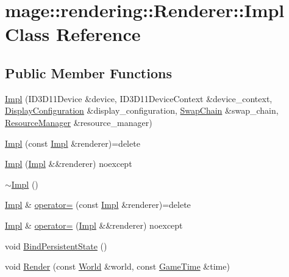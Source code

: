 \hypertarget{classmage_1_1rendering_1_1_renderer_1_1_impl}{}\section{mage\+:\+:rendering\+:\+:Renderer\+:\+:Impl Class Reference}
\label{classmage_1_1rendering_1_1_renderer_1_1_impl}
\subsection*{Public Member Functions}
\begin{DoxyCompactItemize}
\item 
\hyperlink{classmage_1_1rendering_1_1_renderer_1_1_impl_a51ee7e924709bda3d53e73e21352849c}{Impl} (I\+D3\+D11\+Device \&device, I\+D3\+D11\+Device\+Context \&device\+\_\+context, \hyperlink{classmage_1_1rendering_1_1_display_configuration}{Display\+Configuration} \&display\+\_\+configuration, \hyperlink{classmage_1_1rendering_1_1_swap_chain}{Swap\+Chain} \&swap\+\_\+chain, \hyperlink{classmage_1_1rendering_1_1_resource_manager}{Resource\+Manager} \&resource\+\_\+manager)
\item 
\hyperlink{classmage_1_1rendering_1_1_renderer_1_1_impl_a533defdba4bd48054c166ecbb46178f5}{Impl} (const \hyperlink{classmage_1_1rendering_1_1_renderer_1_1_impl}{Impl} \&renderer)=delete
\item 
\hyperlink{classmage_1_1rendering_1_1_renderer_1_1_impl_abc02d1958ce940e8b13d4fe3de3fd05f}{Impl} (\hyperlink{classmage_1_1rendering_1_1_renderer_1_1_impl}{Impl} \&\&renderer) noexcept
\item 
\hyperlink{classmage_1_1rendering_1_1_renderer_1_1_impl_a80064673490a87b9f3cd567e56d3de8f}{$\sim$\+Impl} ()
\item 
\hyperlink{classmage_1_1rendering_1_1_renderer_1_1_impl}{Impl} \& \hyperlink{classmage_1_1rendering_1_1_renderer_1_1_impl_a8eef87ba80c22cba7a2d83db9a740188}{operator=} (const \hyperlink{classmage_1_1rendering_1_1_renderer_1_1_impl}{Impl} \&renderer)=delete
\item 
\hyperlink{classmage_1_1rendering_1_1_renderer_1_1_impl}{Impl} \& \hyperlink{classmage_1_1rendering_1_1_renderer_1_1_impl_a1c40e03347062b200b3e1b214ea7b3ff}{operator=} (\hyperlink{classmage_1_1rendering_1_1_renderer_1_1_impl}{Impl} \&\&renderer) noexcept
\item 
void \hyperlink{classmage_1_1rendering_1_1_renderer_1_1_impl_a86f42e039c290e75378040805533bd41}{Bind\+Persistent\+State} ()
\item 
void \hyperlink{classmage_1_1rendering_1_1_renderer_1_1_impl_a88a8601b5fe72883788a87ba6c38b3aa}{Render} (const \hyperlink{classmage_1_1rendering_1_1_world}{World} \&world, const \hyperlink{classmage_1_1_game_time}{Game\+Time} \&time)
\end{DoxyCompactItemize}
